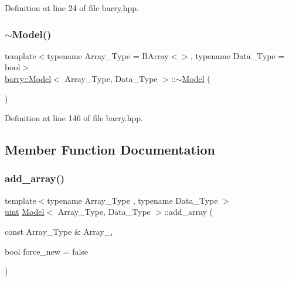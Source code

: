 Definition at line 24 of file barry.\+hpp.

\mbox{\label{classbarry_1_1_model_ab01cbe8e9e9c6ceb56463dbe6be90059}} 
\subsubsection{\texorpdfstring{$\sim$\+Model()}{~Model()}}
{\footnotesize\ttfamily template$<$typename Array\+\_\+\+Type  = B\+Array$<$$>$, typename Data\+\_\+\+Type  = bool$>$ \\
\hyperlink{classbarry_1_1_model}{barry\+::\+Model}$<$ Array\+\_\+\+Type, Data\+\_\+\+Type $>$\+::$\sim$\hyperlink{classbarry_1_1_model}{Model} (\begin{DoxyParamCaption}{ }\end{DoxyParamCaption})\hspace{0.3cm}{\ttfamily [inline]}}



Definition at line 146 of file barry.\+hpp.



\subsection{Member Function Documentation}
\mbox{\label{classbarry_1_1_model_a28ad7090cb5b3f3be9e24d9aef15ce75}} 
\subsubsection{\texorpdfstring{add\+\_\+array()}{add\_array()}}
{\footnotesize\ttfamily template$<$typename Array\+\_\+\+Type , typename Data\+\_\+\+Type $>$ \\
\hyperlink{namespacebarry_a11dfc53ddb4672278319aa04f1e09a6c}{uint} \hyperlink{classbarry_1_1_model}{Model}$<$ Array\+\_\+\+Type, Data\+\_\+\+Type $>$\+::add\+\_\+array (\begin{DoxyParamCaption}\item[{const Array\+\_\+\+Type \&}]{Array\+\_\+,  }\item[{bool}]{force\+\_\+new = {\ttfamily false} }\end{DoxyParamCaption})\hspace{0.3cm}{\ttfamily [inline]}}



